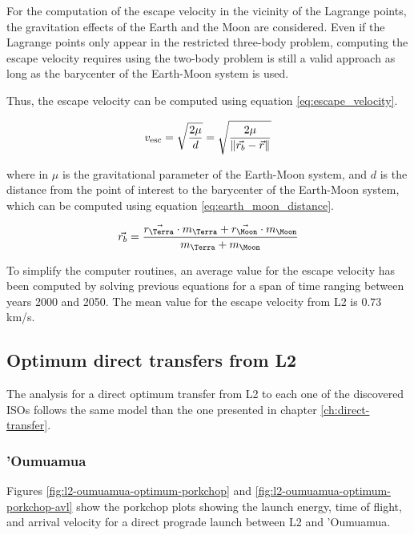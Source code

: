 For the computation of the escape velocity in the vicinity of the Lagrange
points, the gravitation effects of the Earth and the Moon are considered. Even
if the Lagrange points only appear in the restricted three-body problem,
computing the escape velocity requires using the two-body problem is still a
valid approach as long as the barycenter of the Earth-Moon system is used.

Thus, the escape velocity can be computed using equation \ref{eq:escape_velocity}.

\begin{equation}
        v_{\text{esc}} = \sqrt{\frac{2 \mu}{d}} = \sqrt{\frac{2 \mu}{\lVert\vec{r_b} - \vec{r}\rVert}}
\label{eq:escape_velocity}
\end{equation}

where in $\mu$ is the gravitational parameter of the Earth-Moon system, and $d$
is the distance from the point of interest to the barycenter of the Earth-Moon
system, which can be computed using equation \ref{eq:earth_moon_distance}.

\begin{equation}
        \vec{r_{b}} = \frac{\vec{r_{\text{\Terra}}} \cdot m_{\text{\Terra}}
        + \vec{r_{\text{\Moon}}} \cdot m_{\text{\Moon}}}{m_{\text{\Terra}} +
        m_{\text{\Moon}}}
    \label{eq:earth_moon_distance}
\end{equation}

To simplify the computer routines, an average value for the escape velocity has
been computed by solving previous equations for a span of time ranging between
years 2000 and 2050. The mean value for the escape velocity from L2 is $0.73$
km/s.

\subsection{Optimum direct transfers from L2}

The analysis for a direct optimum transfer from L2 to each one of the discovered
ISOs follows the same model than the one presented in chapter
\ref{ch:direct-transfer}.

\subsubsection{'Oumuamua}

Figures \ref{fig:l2-oumuamua-optimum-porkchop} and
\ref{fig:l2-oumuamua-optimum-porkchop-avl} show the porkchop plots showing the
launch energy, time of flight, and arrival velocity for a direct prograde launch
between L2 and 'Oumuamua.

